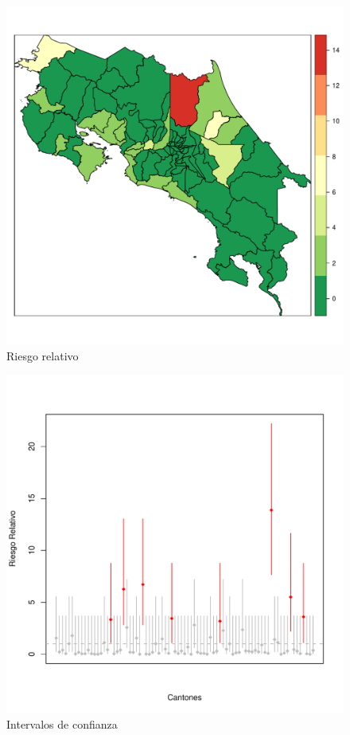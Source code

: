 \documentclass[12pt,a4paper]{article}
\begin{document}
\begin{figure}[hbtp]
\centering
\includegraphics[scale=0.5]{F5.pdf}
\caption{Riesgo relativo}
\end{figure}

\begin{figure}[hbtp]
\centering
\includegraphics[scale=0.75]{F6.pdf}
\caption{Intervalos de confianza}
\end{figure}
\end{document}
